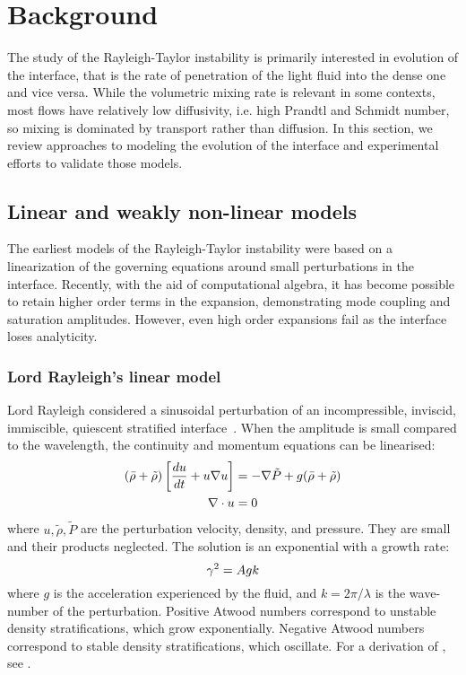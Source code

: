 \chapter{Background}

The study of the Rayleigh-Taylor instability is primarily interested in evolution of the interface, that is the rate of penetration of the light fluid into the dense one and vice versa.
While the volumetric mixing rate is relevant in some contexts, most flows have relatively low diffusivity, i.e. high Prandtl and Schmidt number, so mixing is dominated by transport rather than diffusion.
In this section, we review approaches to modeling the evolution of the interface and experimental efforts to validate those models.

\section{Linear and weakly non-linear models} %

The earliest models of the Rayleigh-Taylor instability were based on a linearization of the governing equations around small perturbations in the interface.
Recently, with the aid of computational algebra, it has become possible to retain higher order terms in the expansion, demonstrating mode coupling and saturation amplitudes.
However, even high order expansions fail as the interface loses analyticity.

\subsection{Lord Rayleigh's linear model}

Lord Rayleigh considered a sinusoidal perturbation of an incompressible, inviscid, immiscible, quiescent stratified interface~\cite{Rayleigh1883}.
When the amplitude is small compared to the wavelength, the continuity and momentum equations can be linearised:
\begin{align}
\left(\bar\rho + \tilde\rho\right) \left[\frac{d u}{d t} + u \nabla u \right] &= - \nabla{\tilde{P}} + g(\bar\rho + \tilde\rho)\\
\nabla \cdot u &= 0 \\
\end{align}
where $u, \tilde\rho, \tilde{P}$ are the perturbation velocity, density, and pressure.
They are small and their products neglected.
The solution is an exponential with a growth rate:
\begin{equation} \elabel{simple_growth}
  \gamma^2 = A g k 
\end{equation}
where $g$ is the acceleration experienced by the fluid, and
$k = 2 \pi / \lambda$ is the wave-number of the perturbation.
Positive Atwood numbers correspond to unstable density stratifications, which grow exponentially.
Negative Atwood numbers correspond to stable density stratifications, which oscillate.
For a derivation of , see .


